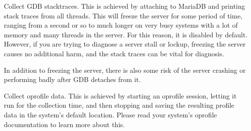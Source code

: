 \documentclass[letterpaper,10pt,english]{sphinxmanual}
\begin{document}
\begin{fulllineitems}
\label{\detokenize{mariadb-stat:cmdoption-mariadb-stat-collect-gdb}}
\sphinxAtStartPar
Collect GDB stacktraces.  This is achieved by attaching to MariaDB and printing
stack traces from all threads. This will freeze the server for some period of
time, ranging from a second or so to much longer on very busy systems with a lot
of memory and many threads in the server.  For this reason, it is disabled by
default. However, if you are trying to diagnose a server stall or lockup,
freezing the server causes no additional harm, and the stack traces can be vital
for diagnosis.

\sphinxAtStartPar
In addition to freezing the server, there is also some risk of the server
crashing or performing badly after GDB detaches from it.

\end{fulllineitems}


\begin{fulllineitems}
\label{\detokenize{mariadb-stat:cmdoption-mariadb-stat-collect-oprofile}}
\sphinxAtStartPar
Collect oprofile data.  This is achieved by starting an oprofile session,
letting it run for the collection time, and then stopping and saving the
resulting profile data in the system’s default location.  Please read your
system’s oprofile documentation to learn more about this.

\end{fulllineitems}

\end{document}
